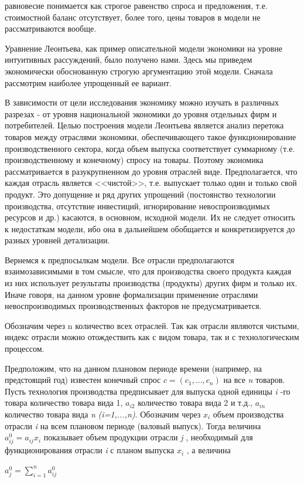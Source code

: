 \documentclass[12pt, 4paper]{book}
\begin{document}
{равновесие понимается как строгое равенство спроса и предложения, т.е. стоимостной баланс отсутствует, более того, цены товаров в модели не рассматриваются вообще.
\par

Уравнение Леонтьева, как пример описательной модели экономики на уровне интуитивных рассуждений, было получено нами. Здесь мы приведем экономически обоснованную строгую аргументацию этой модели. Сначала рассмотрим наиболее упрощенный ее вариант.
\par

В зависимости от цели исследования экономику можно изучать в различных разрезах - от уровня национальной экономики до уровня отдельных фирм и потребителей. Целью построения модели Леонтьева является анализ перетока товаров между отраслями экономики, обеспечивающего такое функционирование производственного сектора, когда объем выпуска соответствует суммарному (т.е. производственному и конечному) спросу на товары. Поэтому экономика рассматривается в разукрупненном до уровня отраслей виде. Предполагается, что каждая отрасль является <<чистой>>, т.е. выпускает только один и только свой продукт. Это допущение и ряд других упрощений (постоянство технологии производства, отсутствие инвестиций, игнорирование невоспроизводимых ресурсов и др.) касаются, в основном, исходной модели. Их не следует относить к недостаткам модели, ибо она в дальнейшем обобщается и конкретизируется до разных уровней детализации.
\par

Вернемся к предпосылкам модели. Все отрасли предполагаются взаимозависимыми в том смысле, что для производства своего продукта каждая из них использует результаты производства (продукты) других фирм и только их. Иначе говоря, на данном уровне формализации применение отраслями невоспроизводимых производственных факторов не предусматривается.
\par

Обозначим через n количество всех отраслей. Так как отрасли являются чистыми, индекс отрасли можно отождествить как с видом товара, так и с технологическим процессом.
\par

Предположим, что на данном плановом периоде времени (например, на предстоящий год) известен конечный спрос $c = (c_1,...,c_n)$ на все \textit{n} товаров. Пусть технология производства предписывает для выпуска одной единицы \textit{i} -го товара  количество товара вида 1, $a_{i2}$ количество товара вида 2 и т.д., $a_{in}$ количество товара вида \textit{n} \textit{(i=1,...,n)}. Обозначим через $x_i$ объем производства отрасли \textit{i} на всем плановом периоде (валовый выпуск). Тогда величина $a_{ij}^{0} = a_{ij}x_{i}$ показывает объем продукции отрасли \textit{j} , необходимый для функционирования отрасли \textit{i} с планом выпуска $x_i$ , а величина
\begin{center}
$a_{j}^{0} = \sum\limits_{i=1}^{n}a_{ij}^{0}$
\end{center}
\par

}
\end{document}
